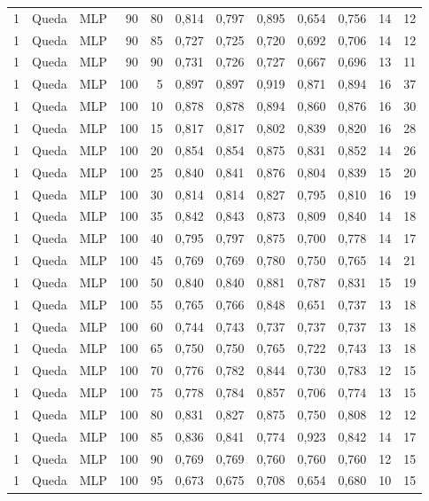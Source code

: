 \begin{longtable}{@{}rllrrrrrrrrr@{}}
1 & Queda & MLP & 90 & 80 & 0,814 & 0,797 & 0,895 & 0,654 & 0,756 & 14 & 12 \\
1 & Queda & MLP & 90 & 85 & 0,727 & 0,725 & 0,720 & 0,692 & 0,706 & 14 & 12 \\
1 & Queda & MLP & 90 & 90 & 0,731 & 0,726 & 0,727 & 0,667 & 0,696 & 13 & 11 \\
1 & Queda & MLP & 100 & 5 & 0,897 & 0,897 & 0,919 & 0,871 & 0,894 & 16 & 37 \\
1 & Queda & MLP & 100 & 10 & 0,878 & 0,878 & 0,894 & 0,860 & 0,876 & 16 & 30 \\
1 & Queda & MLP & 100 & 15 & 0,817 & 0,817 & 0,802 & 0,839 & 0,820 & 16 & 28 \\
1 & Queda & MLP & 100 & 20 & 0,854 & 0,854 & 0,875 & 0,831 & 0,852 & 14 & 26 \\
1 & Queda & MLP & 100 & 25 & 0,840 & 0,841 & 0,876 & 0,804 & 0,839 & 15 & 20 \\
1 & Queda & MLP & 100 & 30 & 0,814 & 0,814 & 0,827 & 0,795 & 0,810 & 16 & 19 \\
1 & Queda & MLP & 100 & 35 & 0,842 & 0,843 & 0,873 & 0,809 & 0,840 & 14 & 18 \\
1 & Queda & MLP & 100 & 40 & 0,795 & 0,797 & 0,875 & 0,700 & 0,778 & 14 & 17 \\
1 & Queda & MLP & 100 & 45 & 0,769 & 0,769 & 0,780 & 0,750 & 0,765 & 14 & 21 \\
1 & Queda & MLP & 100 & 50 & 0,840 & 0,840 & 0,881 & 0,787 & 0,831 & 15 & 19 \\
1 & Queda & MLP & 100 & 55 & 0,765 & 0,766 & 0,848 & 0,651 & 0,737 & 13 & 18 \\
1 & Queda & MLP & 100 & 60 & 0,744 & 0,743 & 0,737 & 0,737 & 0,737 & 13 & 18 \\
1 & Queda & MLP & 100 & 65 & 0,750 & 0,750 & 0,765 & 0,722 & 0,743 & 13 & 18 \\
1 & Queda & MLP & 100 & 70 & 0,776 & 0,782 & 0,844 & 0,730 & 0,783 & 12 & 15 \\
1 & Queda & MLP & 100 & 75 & 0,778 & 0,784 & 0,857 & 0,706 & 0,774 & 13 & 15 \\
1 & Queda & MLP & 100 & 80 & 0,831 & 0,827 & 0,875 & 0,750 & 0,808 & 12 & 12 \\
1 & Queda & MLP & 100 & 85 & 0,836 & 0,841 & 0,774 & 0,923 & 0,842 & 14 & 17 \\
1 & Queda & MLP & 100 & 90 & 0,769 & 0,769 & 0,760 & 0,760 & 0,760 & 12 & 15 \\
1 & Queda & MLP & 100 & 95 & 0,673 & 0,675 & 0,708 & 0,654 & 0,680 & 10 & 15 \\

\end{longtable}
